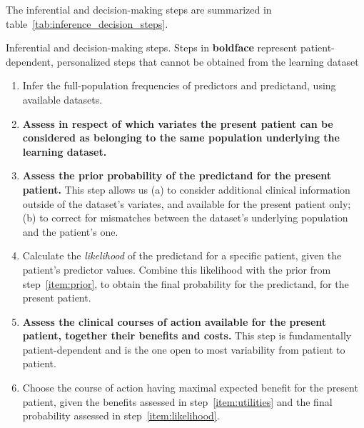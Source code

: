 \documentclass[utf8]{FrontiersinHarvard} %
\renewcommand*{\|}[1][]{\nonscript\:#1\vert\nonscript\:\mathopen{}}
\begin{document}
The inferential and decision-making steps are summarized in table~\ref{tab:inference_decision_steps}.
\begin{table}[!h]  
  \centering
  \begin{framed}
    \caption{Inferential and decision-making steps. Steps in \textbf{boldface} represent patient-dependent, personalized steps that cannot be obtained from the learning dataset}\label{tab:inference_decision_steps}

    \vspace{1em}
    
    \begin{enumerate}\itemsep1em 
    \item\label{item:learn} Infer the full-population frequencies of predictors and predictand, using available datasets.
    \item\label{item:population} \textbf{Assess in respect of which variates the present patient can be considered as belonging to the same population underlying the learning dataset.}
    \item\label{item:prior} \textbf{Assess the prior probability of the predictand for the present patient.} This step allows us (a) to consider additional clinical information outside of the dataset's variates, and available for the present patient only; (b) to correct for mismatches between the dataset's underlying population and the patient's one.
      
    \item\label{item:likelihood}Calculate the \emph{likelihood}
      of the predictand for a specific patient, given the patient's predictor values. Combine this likelihood with the prior from step~\ref{item:prior}, to obtain the final probability for the predictand, for the present patient.

    \item\label{item:utilities} \textbf{Assess the clinical courses of action available for the present patient, together their benefits and costs.} This step is fundamentally patient-dependent and is the one open to most variability from patient to patient.

    \item\label{item:expected_utility} Choose the course of action having maximal expected benefit for the present patient, given the benefits assessed in step~\ref{item:utilities} and the final probability assessed in step~\ref{item:likelihood}.  
    \end{enumerate}
  \end{framed}
\end{table}
\end{document}
